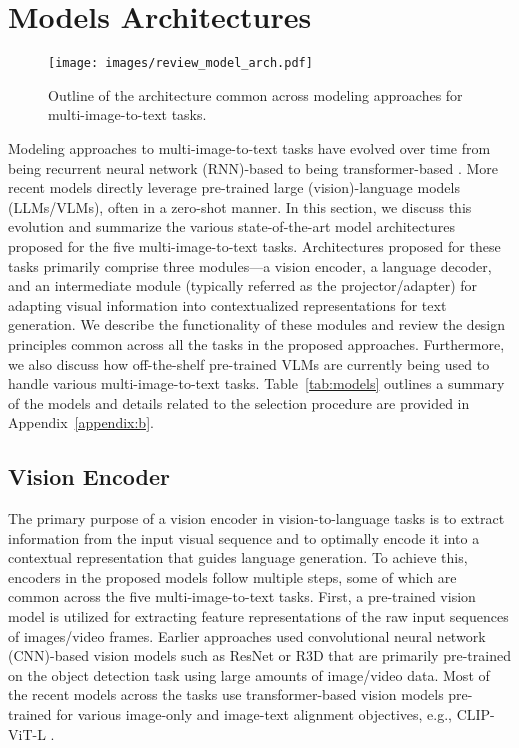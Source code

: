 \section{Models Architectures}
\label{sec:models}

\begin{figure*}[htbp]
  \centering
  \texttt{[image: images/review\_model\_arch.pdf]}
  \caption{Outline of the architecture common across modeling approaches for multi-image-to-text tasks.}
  \label{fig:model_arch}
\end{figure*}

Modeling approaches to multi-image-to-text tasks have evolved over time from being recurrent neural network (RNN)-based \cite{lstm} to being transformer-based \cite{transformer}. More recent models directly leverage pre-trained large (vision)-language models (LLMs/VLMs), often in a zero-shot manner. In this section, we discuss this evolution and summarize the various state-of-the-art model architectures proposed for the five multi-image-to-text tasks. Architectures proposed for these tasks primarily comprise three modules---a vision encoder, a language decoder, and an intermediate module (typically referred as the projector/adapter) for adapting visual information into contextualized representations for text generation. We describe the functionality of these modules and review the design principles common across all the tasks in the proposed approaches. Furthermore, we also discuss how off-the-shelf  pre-trained VLMs are currently being used to handle various multi-image-to-text tasks. Table~\ref{tab:models} outlines a summary of the models and details related to the selection procedure are provided in Appendix~\ref{appendix:b}.

\subsection{Vision Encoder}

The primary purpose of a vision encoder in vision-to-language tasks is to extract information from the input visual sequence and to optimally encode it into a contextual representation that guides language generation. To achieve this, encoders in the proposed models follow multiple steps, some of which are common across the five multi-image-to-text tasks. First, a pre-trained vision model is utilized for extracting feature representations of the raw input sequences of images/video frames. Earlier approaches used convolutional neural network (CNN)-based vision models such as ResNet \cite{resnet} or R3D \cite{resnet3d} that are primarily pre-trained on the object detection task using large amounts of image/video data. Most of the recent models across the tasks use transformer-based vision models pre-trained for various image-only and image-text alignment objectives, e.g., CLIP-ViT-L \cite{clip}.

